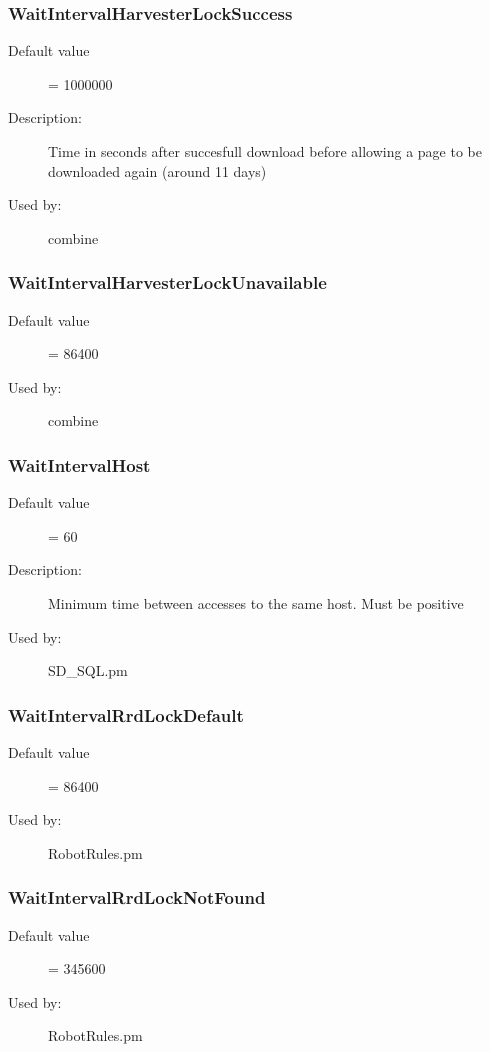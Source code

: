 \subsubsection{WaitIntervalHarvesterLockSuccess}
\label{WaitIntervalHarvesterLockSuccess}
\begin{description}
\item[Default value] = 1000000
\item[Description:] Time in seconds after succesfull download before allowing a page to be downloaded again (around 11 days)
\item[Used by:] combine
\end{description}
\subsubsection{WaitIntervalHarvesterLockUnavailable}
\label{WaitIntervalHarvesterLockUnavailable}
\begin{description}
\item[Default value] = 86400
\item[Used by:] combine
\end{description}
\subsubsection{WaitIntervalHost}
\label{WaitIntervalHost}
\begin{description}
\item[Default value] = 60
\item[Description:] Minimum time between accesses to the same host. Must be positive
\item[Used by:] SD\_SQL.pm
\end{description}
\subsubsection{WaitIntervalRrdLockDefault}
\label{WaitIntervalRrdLockDefault}
\begin{description}
\item[Default value] = 86400
\item[Used by:] RobotRules.pm
\end{description}
\subsubsection{WaitIntervalRrdLockNotFound}
\label{WaitIntervalRrdLockNotFound}
\begin{description}
\item[Default value] = 345600
\item[Used by:] RobotRules.pm
\end{description}
